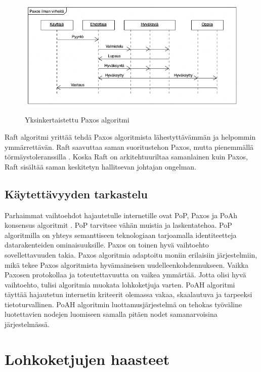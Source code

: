 \documentclass[utf8,bachelor]{gradu3}
\begin{document}
\begin{figure}[h]\centering
  \includegraphics[height=6cm,keepaspectratio]{PaxosDiag}
  \caption[Yksinkertaistettu Paxos algoritmi]{Yksinkertaistettu Paxos algoritmi}
  \label{fig:Paxos}
\end{figure}

Raft algoritmi yrittää tehdä Paxos algoritmista lähestyttävämmän ja helpommin ymmärrettävän. Raft saavuttaa saman suoritustehon Paxos, mutta pienemmällä törmäystoleranssilla \parencite{panda2019study}. 
Koska Raft on arkitehtuuriltaa samanlainen kuin Paxos, Raft sisältää saman keskitetyn hallitsevan johtajan ongelman.

\section{Käytettävyyden tarkastelu}
Parhaimmat vaihtoehdot hajautetulle internetille ovat PoP, Paxos ja PoAh konsensus algoritmit \parencite{zarrin2021blockchain}. 
PoP tarvitsee vähän muistia ja laskentatehoa.
PoP algoritmilla on yhteys semanttiseen teknologiaan tarjoamalla identiteetteja datarakenteiden ominaisuuksille.
Paxos on toinen hyvä vaihtoehto sovellettavuuden takia. Paxos algoritmia adaptoitu moniin erilaisiin järjestelmiin, mikä tekee Paxos algoritmista hyvämaineisen uudelleenkohdennukseen.
Vaikka Paxosen protokollaa ja toteutettavuutta on vaikea ymmärtää. Jotta olisi hyvä vaihtoehto, tulisi algoritmia muokata lohkoketjuja varten.
PoAH algoritmi täyttää hajautetun internetin kriteerit olemassa vakaa, skaalautuva ja tarpeeksi tietoturvallinen. PoAH algoritmin luottamusjärjestelmä on tehokas työväline luotettavien nodejen luomiseen samalla pitäen nodet samanarvoisina järjestelmässä.

\chapter{Lohkoketjujen haasteet}\label{Haasteet}
\end{document}
